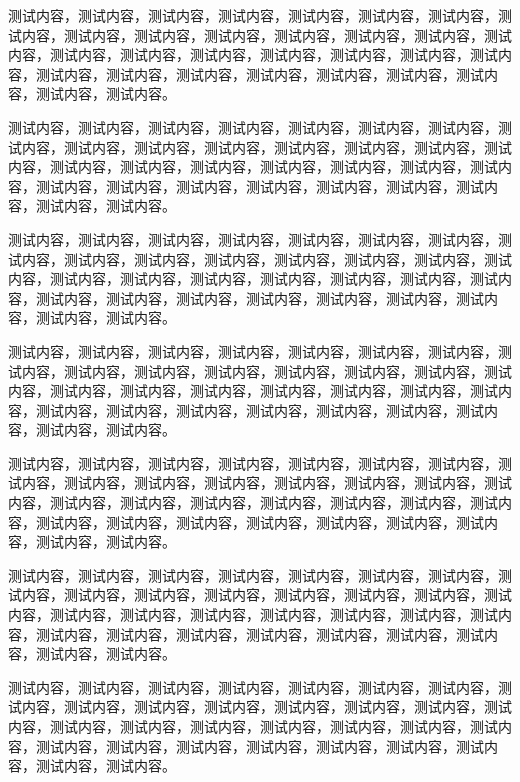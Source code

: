 \documentclass[twocolumn,answer,full,c5s]{HPUexam}
\begin{document}
测试内容，测试内容，测试内容，测试内容，测试内容，测试内容，测试内容，测试内容，测试内容，测试内容，测试内容，测试内容，测试内容，测试内容，测试内容，测试内容，测试内容，测试内容，测试内容，测试内容，测试内容，测试内容，测试内容，测试内容，测试内容，测试内容，测试内容，测试内容，测试内容，测试内容，测试内容。

\vspace{25ex}


测试内容，测试内容，测试内容，测试内容，测试内容，测试内容，测试内容，测试内容，测试内容，测试内容，测试内容，测试内容，测试内容，测试内容，测试内容，测试内容，测试内容，测试内容，测试内容，测试内容，测试内容，测试内容，测试内容，测试内容，测试内容，测试内容，测试内容，测试内容，测试内容，测试内容，测试内容。

测试内容，测试内容，测试内容，测试内容，测试内容，测试内容，测试内容，测试内容，测试内容，测试内容，测试内容，测试内容，测试内容，测试内容，测试内容，测试内容，测试内容，测试内容，测试内容，测试内容，测试内容，测试内容，测试内容，测试内容，测试内容，测试内容，测试内容，测试内容，测试内容，测试内容，测试内容。

\vspace{45ex}


测试内容，测试内容，测试内容，测试内容，测试内容，测试内容，测试内容，测试内容，测试内容，测试内容，测试内容，测试内容，测试内容，测试内容，测试内容，测试内容，测试内容，测试内容，测试内容，测试内容，测试内容，测试内容，测试内容，测试内容，测试内容，测试内容，测试内容，测试内容，测试内容，测试内容，测试内容。

测试内容，测试内容，测试内容，测试内容，测试内容，测试内容，测试内容，测试内容，测试内容，测试内容，测试内容，测试内容，测试内容，测试内容，测试内容，测试内容，测试内容，测试内容，测试内容，测试内容，测试内容，测试内容，测试内容，测试内容，测试内容，测试内容，测试内容，测试内容，测试内容，测试内容，测试内容。

测试内容，测试内容，测试内容，测试内容，测试内容，测试内容，测试内容，测试内容，测试内容，测试内容，测试内容，测试内容，测试内容，测试内容，测试内容，测试内容，测试内容，测试内容，测试内容，测试内容，测试内容，测试内容，测试内容，测试内容，测试内容，测试内容，测试内容，测试内容，测试内容，测试内容，测试内容。

测试内容，测试内容，测试内容，测试内容，测试内容，测试内容，测试内容，测试内容，测试内容，测试内容，测试内容，测试内容，测试内容，测试内容，测试内容，测试内容，测试内容，测试内容，测试内容，测试内容，测试内容，测试内容，测试内容，测试内容，测试内容，测试内容，测试内容，测试内容，测试内容，测试内容，测试内容。
\end{document}
